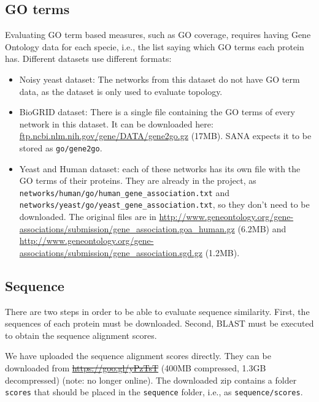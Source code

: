 \documentclass[]{article}
\begin{document}
\subsection{GO terms}\label{b:goterms}
Evaluating GO term based measures, such as GO coverage, requires having Gene Ontology data for each specie, i.e., the list saying which GO terms each protein has. Different datasets use different formats:
\begin{itemize}
\item Noisy yeast dataset: The networks from this dataset do not have GO term data, as the dataset is only used to evaluate topology.
\item BioGRID dataset: There is a single file containing the GO terms of every network in this dataset. It can be downloaded here: \url{ftp.ncbi.nlm.nih.gov/gene/DATA/gene2go.gz} (17MB). SANA expects it to be stored as \texttt{go/gene2go}.
\item Yeast and Human dataset: each of these networks has its own file with the GO terms of their proteins. They are already in the project, as\\ \texttt{networks/human/go/human\_gene\_association.txt} and\\ \texttt{networks/yeast/go/yeast\_gene\_association.txt}, so they don't need to be downloaded. The original files are in \url{http://www.geneontology.org/gene-associations/submission/gene_association.goa_human.gz} (6.2MB) and \url{http://www.geneontology.org/gene-associations/submission/gene_association.sgd.gz} (1.2MB).
\end{itemize}

\subsection{Sequence}\label{b:sequence}
There are two steps in order to be able to evaluate sequence similarity. First, the sequences of each protein must be downloaded. Second, BLAST must be executed to obtain the sequence alignment scores.

We have uploaded the sequence alignment scores directly. They can be downloaded from  \sout{\url{https://goo.gl/yPzTsT}} (400MB compressed, 1.3GB decompressed) (note: no longer online). The downloaded zip contains a folder \texttt{scores} that should be placed in the \texttt{sequence} folder, i.e., as \texttt{sequence/scores}.
\end{document}
